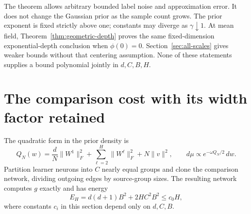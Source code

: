 \documentclass[11pt]{article}
\begin{document}
The theorem allows arbitrary bounded label noise and approximation error. It does not change the Gaussian prior as the sample count grows. The prior exponent is fixed strictly above one; constants may diverge as $\gamma\downarrow1$. At mean field, Theorem~\ref{thm:geometric-depth} proves the same fixed-dimension exponential-depth conclusion when $\phi(0)=0$. Section~\ref{sec:all-scales} gives weaker bounds without that centering assumption. None of these statements supplies a bound polynomial jointly in $d,C,B,H$.

\section{The comparison cost with its width factor retained}
The quadratic form in the prior density is
\[
 Q_N(w)=\frac dN\|W^1\|_F^2+
          \sum_{\ell=2}^H\|W^\ell\|_F^2+N\|v\|^2,
 \qquad d\mu\propto e^{-\omega Q_N/2}\,dw.
\]
Partition learner neurons into $C$ nearly equal groups and clone the comparison network, dividing outgoing edges by source-group sizes. The resulting network computes $g$ exactly and has energy
\[
 E_H=d(d+1)B^2+2HC^2B^2\le c_0H,
\]
where constants $c_i$ in this section depend only on $d,C,B$.
\end{document}
